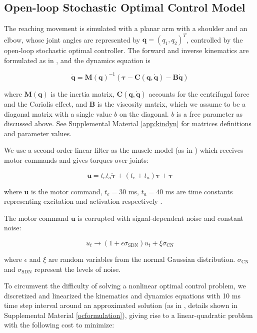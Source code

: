 \subsection{Open-loop Stochastic Optimal Control Model}
The reaching movement is simulated with a planar arm with a shoulder and an elbow, whose joint angles are represented by $\bm{q} = (q_1, q_2)^T$, controlled by the open-loop stochastic optimal controller. 
The forward and inverse kinematics are formulated as in \cite{VanBeers2004}, and the dynamics equation is

\begin{equation} \label{maindynamics}
	\ddot{\bm{q}} = \bm{M}(\bm{q})^{-1} (\bm{\tau} - \bm{C}(\bm{q}, \dot{\bm{q}}) - \bm{B}\dot{\bm{q}})
\end{equation}

where $\bm{M}(\bm{q})$ is the inertia matrix, $\bm{C}(\bm{q}, \dot{\bm{q}})$ accounts for the centrifugal force and the Coriolis effect, and $\bm{B}$ is the viscosity matrix, which we assume to be a diagonal matrix with a single value $b$ on the diagonal. $b$ is a free parameter as discussed above. 
See Supplemental Material \ref{app:kindyn} for matrices definitions and parameter values.

We use a second-order linear filter as the muscle model (as in \cite{VanBeers2004}) which receives motor commands and gives torques over joints:

\begin{equation}
	\bm{u} = t_et_a\ddot{\bm{\tau}} + (t_e+t_a)\dot{\bm{\tau}} +\bm{\tau}
\end{equation}

where $\bm{u}$ is the motor command, $t_e = 30$ ms, $t_a = 40$ ms are time constants representing excitation and activation respectively \cite{VanderHelm2000}. 

The motor command $\bm{u}$ is corrupted with signal-dependent noise and constant noise:

\begin{equation}\label{eqn:cnsdn}
u_t \rightarrow (1 + \epsilon\sigma_{\text{SDN}}) u_t + \xi\sigma_{\text{CN}}
\end{equation}

where $\epsilon$ and $\xi$ are random variables from the normal Gaussian distribution.
$\sigma_{\text{CN}}$ and $\sigma_{\text{SDN}}$ represent the levels of noise.

To circumvent the difficulty of solving a nonlinear optimal control problem, we discretized and linearized the kinematics and dynamics equations with 10 ms time step interval around an approximated solution (as in \cite{Li2004}, details shown in Supplemental Material \ref{ocformulation}), giving rise to a linear-quadratic problem with the following cost to minimize:

